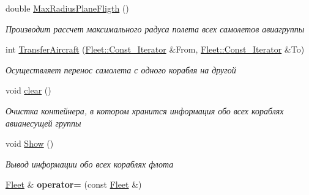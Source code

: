 \begin{DoxyCompactItemize}
\mbox{\label{class_aircraft_carrier_group_1_1_fleet_ad36b1f4f06ac7f267e61d7fed71c04ff}} 
double \mbox{\hyperlink{class_aircraft_carrier_group_1_1_fleet_ad36b1f4f06ac7f267e61d7fed71c04ff}{Max\+Radius\+Plane\+Fligth}} ()
\begin{DoxyCompactList}\small\item\em Производит рассчет максимального радуса полета всех самолетов авиагруппы \end{DoxyCompactList}\item 
int \mbox{\hyperlink{class_aircraft_carrier_group_1_1_fleet_afdc755fad8b201aa497161a5ef63a97c}{Transfer\+Aircraft}} (\mbox{\hyperlink{class_aircraft_carrier_group_1_1_const_fleet_it}{Fleet\+::\+Const\+\_\+\+Iterator}} \&From, \mbox{\hyperlink{class_aircraft_carrier_group_1_1_const_fleet_it}{Fleet\+::\+Const\+\_\+\+Iterator}} \&To)
\begin{DoxyCompactList}\small\item\em Осуществляет перенос самолета с одного корабля на другой \end{DoxyCompactList}\item 
\mbox{\label{class_aircraft_carrier_group_1_1_fleet_abe8311c40460ab1a8d32d9825980ca8a}} 
void \mbox{\hyperlink{class_aircraft_carrier_group_1_1_fleet_abe8311c40460ab1a8d32d9825980ca8a}{clear}} ()
\begin{DoxyCompactList}\small\item\em Очистка контейнера, в котором хранится информация обо всех кораблях авианесущей группы \end{DoxyCompactList}\item 
\mbox{\label{class_aircraft_carrier_group_1_1_fleet_a34d66ddac9b45d0b64202486ed484074}} 
void \mbox{\hyperlink{class_aircraft_carrier_group_1_1_fleet_a34d66ddac9b45d0b64202486ed484074}{Show}} ()
\begin{DoxyCompactList}\small\item\em Вывод информации обо всех кораблях флота \end{DoxyCompactList}\item 
\mbox{\label{class_aircraft_carrier_group_1_1_fleet_aaa91e21c9a4b9c56d3bb5e57a92bb464}} 
\mbox{\hyperlink{class_aircraft_carrier_group_1_1_fleet}{Fleet}} \& {\bfseries operator=} (const \mbox{\hyperlink{class_aircraft_carrier_group_1_1_fleet}{Fleet}} \&)
\end{DoxyCompactItemize}
